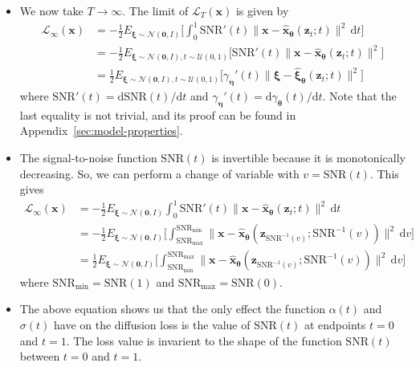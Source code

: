 \documentclass[10pt]{article}
\newcommand{\dee}{\mathrm{d}}
\newcommand{\ve}[1]{\mathbf{#1}}
\newcommand{\ves}[1]{\boldsymbol{#1}}
\newcommand{\mcal}[1]{\mathcal{#1}}
\newcommand{\SNR}{\mathrm{SNR}}
\begin{document}
\begin{itemize}
  \item We now take $T \rightarrow \infty$. The limit of $\mcal{L}_T(\ve{x})$ is given by
  \begin{align*}
    \mcal{L}_{\infty}(\ve{x}) 
    &= -\frac{1}{2} E_{\ves{\xi} \sim \mcal{N}(\ve{0},I)} \bigg[ \int_0^1 \SNR'(t) \| \ve{x} - \hat{\ve{x}}_{\ves{\theta}}(\ve{z}_t; t) \|^2 \, \dee t \bigg] \\
    &= -\frac{1}{2} E_{\ves{\xi} \sim \mcal{N}(\ve{0},I), t \sim \mcal{U}(0,1)} \big[ \SNR'(t) \| \ve{x} - \hat{\ve{x}}_{\ves{\theta}}(\ve{z}_t; t) \|^2 \big] \\
    &= \frac{1}{2} E_{\ves{\xi} \sim \mcal{N}(\ve{0},I), t \sim \mcal{U}(0,1)} \big[ \gamma_{\ves{\eta}}'(t) \| \ves{\xi} - \hat{\ves{\xi}}_{\ves{\theta}}(\ve{z}_t; t) \|^2 \big]
  \end{align*}
  where $\SNR'(t) = \dee \SNR(t) / \dee t$ and $\gamma_{\ves{\eta}}'(t) = \dee \gamma_{\ves{\theta}}(t) / \dee t$. Note that the last equality is not trivial, and its proof can be found in Appendix~\ref{sec:model-properties}.

  \item The signal-to-noise function $\SNR(t)$ is invertible because it is monotonically decreasing. So, we can perform a change of variable with $v = \SNR(t)$. This gives
  \begin{align*}
    \mcal{L}_{\infty}(\ve{x}) 
    &= -\frac{1}{2} E_{\ves{\xi} \sim \mcal{N}(\ve{0},I)} \int_0^1 \SNR'(t) \| \ve{x} - \hat{\ve{x}}_{\ves{\theta}}(\ve{z}_t; t) \|^2\, \dee t \\
    &= -\frac{1}{2} E_{\ves{\xi} \sim \mcal{N}(\ve{0},I)} \bigg[ \int_{\SNR_{\max}}^{\SNR_{\min}} \| \ve{x} - \hat{\ve{x}}_{\ves{\theta}}(\ve{z}_{\SNR^{-1}(v)}; \SNR^{-1}(v)) \|^2\, \dee v \bigg] \\
    &= \frac{1}{2} E_{\ves{\xi} \sim \mcal{N}(\ve{0},I)} \bigg[ \int_{\SNR_{\min}}^{\SNR_{\max}} \| \ve{x} - \hat{\ve{x}}_{\ves{\theta}}(\ve{z}_{\SNR^{-1}(v)}; \SNR^{-1}(v)) \|^2\, \dee v \bigg]
  \end{align*}
  where $\SNR_{\min} = \SNR(1)$ and $\SNR_{\max} = \SNR(0)$.
  
  \item The above equation shows us that the only effect the function $\alpha(t)$ and $\sigma(t)$ have on the diffusion loss is the value of $\SNR(t)$ at endpoints $t = 0$ and $t = 1$. The loss value is invarient to the shape of the function $\SNR(t)$ between $t = 0$ and $t = 1$.
  

\end{itemize}
\end{document}
